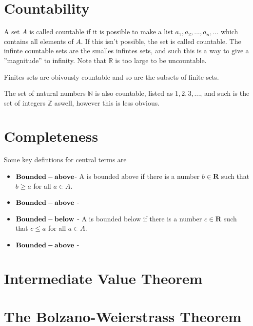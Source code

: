 \documentclass[12pt,letterpaper]{article}
\begin{document}
\section*{Countability}
A set $A$ is called countable if it is possible to make a list $a_1, a_2, ..., a_n,...$ which contains all elements of $A$. If this isn't possible, the set is called countable. 
The infinte countable sets are the smalles infintes sets, and such this is a way to give a ''magnitude'' to infinity. Note that $\mathbb{R}$ is too large to be uncountable.

\noindent
Finites sets are obivously countable and so are the subsets of finite sets.

\noindent
The set of natural numbers $\mathbb{N}$ is also countable, listed as $1,2,3,...$, and such is the set of integers $\mathbb{Z}$ aswell, however this is less obvious.

\noindent


\section*{Completeness}
Some key defintions for central terms are 
\begin{itemize}
	\item $\bold{Bounded-above}$- A is bounded above if there is a number $b\in\mathbf{R}$ such that $b\ge a$ for all $a\in A$.
	\item $\bold{Bounded-above}$ - 
	\item $\bold{Bounded-below}$ - A is bounded below if there is a number $c\in\mathbf{R}$ such that $c\le a$ for all $a\in A$.
	\item $\bold{Bounded-above}$ - 
\end{itemize}




\section*{Intermediate Value Theorem}






\section*{The Bolzano-Weierstrass Theorem}
\end{document}
